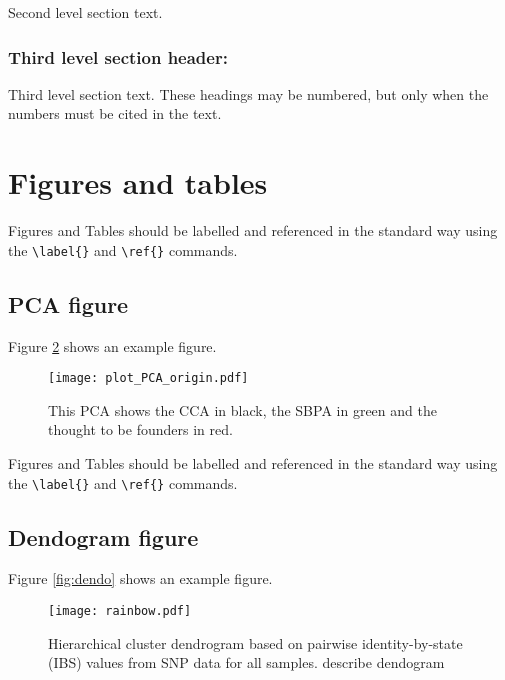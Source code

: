 \documentclass[9pt,twocolumn,twoside,lineno]{gsajnl}
\begin{document}
Second level section text.

\subsubsection{Third level section header:}

Third level section text. These headings may be numbered, but only when the numbers must be cited in the text.

\section{Figures and tables}

Figures and Tables should be labelled and referenced in the standard way using the \verb|\label{}| and \verb|\ref{}| commands.

\subsection{PCA figure}

Figure \ref{fig:pca} shows an example figure.

\begin{figure}[t]
\centering
\texttt{[image: plot\_PCA\_origin.pdf]}
\caption{This PCA shows the CCA in black, the SBPA in green and the thought to be founders in red.}%
\label{fig:pca}
\end{figure}


Figures and Tables should be labelled and referenced in the standard way using the \verb|\label{}| and \verb|\ref{}| commands.

\subsection{Dendogram figure}

Figure \ref{fig:dendo} shows an example figure.

\begin{figure}[t]
\centering
\texttt{[image: rainbow.pdf]}
\caption{Hierarchical cluster dendrogram based on pairwise identity-by-state (IBS) values from SNP data for all samples. describe dendogram}%
\label{fig:pca}
\end{figure}
\end{document}
